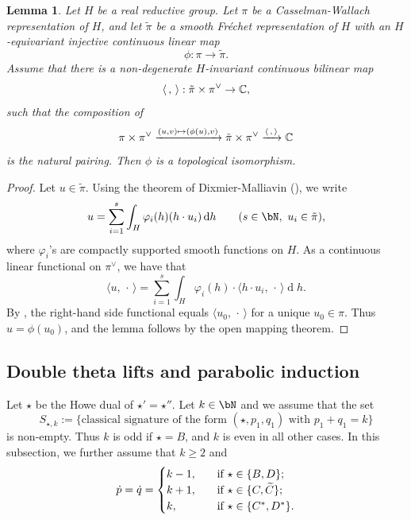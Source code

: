\documentclass[11pt,a4paper]{amsart}
\newcommand{\od}{\operatorname{d}}
\newcommand{\la}{\langle}
\newcommand{\ra}{\rangle}
\newcommand{\be}{\begin {equation}}
\newcommand{\ee}{\end {equation}}
\numberwithin{equation}{section}
\newtheorem{lem}[thm]{Lemma}
\theoremstyle{remark}
\begin{document}
\begin{lem}\label{imb2}
Let $H$ be a real reductive group. Let $\pi$ be a Casselman-Wallach representation of $H$, and let $\tilde \pi$ be a smooth Fr\'echet representation of $H$ with an $H$-equivariant injective continuous linear map
\[
  \phi: \pi\rightarrow \tilde \pi.
\]
Assume that  there is a non-degenerate $H$-invariant continuous bilinear map
\[
\la\,,\,\ra: \tilde \pi\times \pi^\vee\rightarrow \C,
\]
such that the composition of
\[
 \pi\times \pi^\vee\xrightarrow{(u,v)\mapsto (\phi(u),v)} \tilde \pi\times \pi^\vee\xrightarrow{\la\,,\,\ra} \C
\]
is the natural pairing. Then $\phi$ is a topological isomorphism.
\end{lem}
\begin{proof}
 Let $u\in \tilde \pi$.
 Using the theorem of Dixmier-Malliavin (\cite[Theorem 3.3]{DM}), we write
 \[
   u=\sum_{i=1}^{s} \int_H \varphi_i(h) ( h\cdot u_i)\od\! h \qquad (s\in \bN, \ u_i\in\tilde \pi),
 \]
 where $\varphi_i$'s are compactly supported smooth functions on $H$.  As a continuous linear functional on $\pi^\vee$, we have that
  \[
   \la u,\, \cdot\, \ra=\sum_{i=1}^{s} \int_H \varphi_i(h)  \cdot \la h\cdot u_i, \,\cdot\,\ra \od\! h.
 \]
By \cite[Lemma 3.5]{SZ1},  the right-hand side  functional  equals  $\la u_0, \,\cdot\,\ra$ for a unique $u_0\in \pi$. Thus $u=\phi(u_0)$, and the lemma follows by the open mapping theorem.
\end{proof}



\subsection{Double theta lifts and parabolic induction}\label{doublep}
Let $\star$ be the Howe dual of $\star'=\star''$. Let $k\in \bN$ and we assume that the set
\be\label{sstark}
 S_{\star, k}:=\{\textrm{classical signature of the form $(\star, p_1,q_1)$ with $p_1+q_1=k$}\}
\ee
is non-empty. Thus $k$ is odd if $\star=B$, and $k$ is even in all other cases.
In this subsection, we further assume that $k\geq 2$ and
\be\label{dotp}
 \dot p=\dot q= \begin{cases}
 k-1,  &\quad \textrm{if } \star\in \{B,D\};\\
k+1,  &\quad  \textrm{if $\star\in \{C, \widetilde C\}$;}\\
k, & \quad  \textrm{if $ \star\in\{C^*,D^*\}$.}
\end{cases}
 \ee
\end{document}
